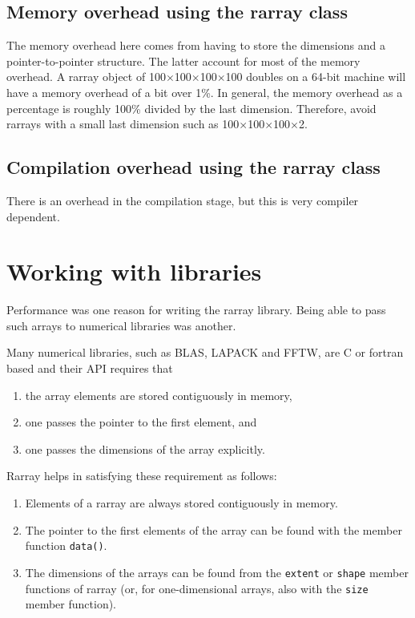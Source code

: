 \documentclass[11pt,twoside]{article}
\begin{document}
\subsection{Memory overhead using the rarray class}

The memory overhead here comes from having to store the dimensions and a pointer-to-pointer structure.  The latter account for most of the memory overhead.   A rarray object of 100$\times$100$\times$100$\times$100  doubles on a 64-bit machine will have a memory overhead of a bit over 1\%. In general, the memory overhead as a percentage is roughly 100\% divided by the last dimension. Therefore, avoid rarrays with a small last dimension such as 100$\times$100$\times$100$\times$2.

\subsection{Compilation overhead using the rarray class}

There is an overhead in the compilation stage, but this is very compiler dependent.

\section{Working with libraries}
\label{libraries}

Performance was one reason for writing the rarray library.  Being able
to pass such arrays to numerical libraries was another.

Many numerical libraries, such as BLAS, LAPACK and FFTW, are C or
fortran based and their API requires that
\begin{enumerate}
\item the array elements are stored contiguously in memory,
\item one passes the pointer to the first element, and
\item one passes the dimensions of the array explicitly.
\end{enumerate}
Rarray helps in satisfying these requirement as follows:
\begin{enumerate}
\item Elements of a rarray are always stored contiguously in memory.
\item The pointer to the first elements of the array can be found with
  the member function \texttt{data()}.
\item The dimensions of the arrays can be found from
    the \texttt{extent} or \texttt{shape} member functions of rarray (or, for
    one-dimensional arrays, also with the \texttt{size} member function).
\end{enumerate}
\end{document}
